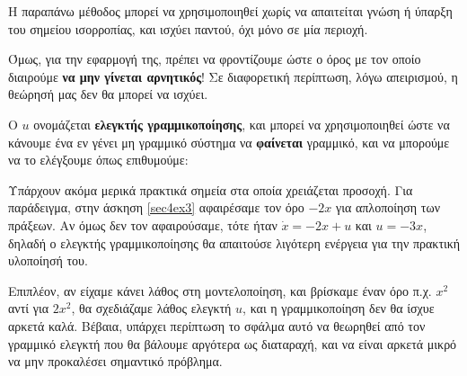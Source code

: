\documentclass[11pt,a4paper,notitlepage,fleqn]{article}
\let\mytodo\todo
\renewcommand{\todo}[1]{\par\mytodo[inline,noline]{#1}}
\begin{document}
Η παραπάνω μέθοδος μπορεί να χρησιμοποιηθεί χωρίς να απαιτείται γνώση
ή ύπαρξη του σημείου ισορροπίας, και ισχύει παντού, όχι μόνο σε μία περιοχή.

Όμως, για την εφαρμογή της, πρέπει να φροντίζουμε ώστε ο όρος με
τον οποίο διαιρούμε \textbf{να μην γίνεται αρνητικός}! Σε διαφορετική
περίπτωση, λόγω απειρισμού, η θεώρησή μας δεν θα μπορεί να ισχύει.

Ο \( u \) ονομάζεται \textbf{ελεγκτής γραμμικοποίησης}, και μπορεί να
χρησιμοποιηθεί ώστε να κάνουμε ένα εν γένει μη γραμμικό σύστημα να
\textbf{φαίνεται} γραμμικό, και να μπορούμε να το ελέγξουμε όπως επιθυμούμε:
\todo{Graph 26}

Υπάρχουν ακόμα μερικά πρακτικά σημεία στα οποία χρειάζεται προσοχή. Για παράδειγμα, στην άσκηση \ref{sec4ex3} αφαιρέσαμε τον όρο \( -2x \) για απλοποίηση
των πράξεων. Αν όμως δεν τον αφαιρούσαμε, τότε ήταν \( \dot x = -2x+u \)
και \( u=-3x \), δηλαδή ο ελεγκτής γραμμικοποίησης θα απαιτούσε λιγότερη
ενέργεια για την πρακτική υλοποίησή του.

Επιπλέον, αν είχαμε κάνει λάθος στη μοντελοποίηση, και βρίσκαμε έναν
όρο π.χ. \( x^2 \) αντί για \( 2x^2 \), θα σχεδιάζαμε λάθος
ελεγκτή \( u \), και η γραμμικοποίηση δεν θα ίσχυε αρκετά καλά. Βέβαια,
υπάρχει περίπτωση το σφάλμα αυτό να θεωρηθεί από τον γραμμικό
ελεγκτή που θα βάλουμε αργότερα ως διαταραχή, και να είναι αρκετά
μικρό να μην προκαλέσει σημαντικό πρόβλημα.
\end{document}
